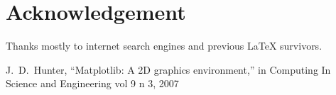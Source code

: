 \documentclass{nslsii}
\begin{document}
\section*{Acknowledgement}
Thanks mostly to internet search engines and previous \LaTeX{} survivors.





\begin{thebibliography}{00}

J.~D.~Hunter, “Matplotlib: A 2D graphics environment,”
in Computing In Science and Engineering vol 9 n 3, 2007


\end{thebibliography}
\end{document}
